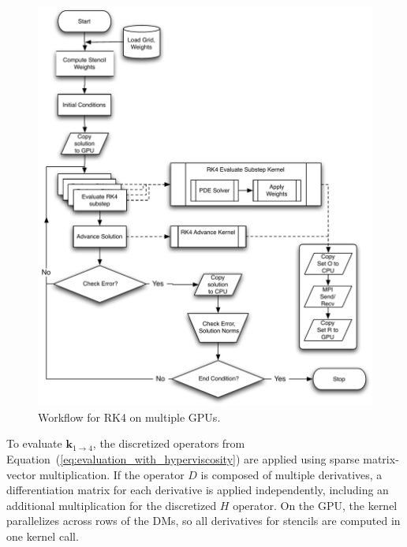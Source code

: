 \documentclass{report}
\begin{document}
\begin{figure}[t]
      \centering
       \includegraphics[width=5in]{../figures/paper1/figures/omnigraffle/RK4_multi_GPU_flow.pdf}
      \caption{Workflow for RK4 on multiple GPUs. }
      \label{fig:multi_GPU_flow}
\end{figure}


To evaluate $\mathbf{k}_{1\rightarrow4}$, the discretized operators from Equation~(\ref{eq:evaluation_with_hyperviscosity}) are applied using sparse matrix-vector multiplication. If the operator $D$ is composed of multiple derivatives, a differentiation matrix for each derivative is applied independently, including an additional multiplication for the discretized $H$ operator.
 On the GPU, the kernel parallelizes across rows of the DMs, so all derivatives for stencils are computed in one kernel call.
\end{document}
